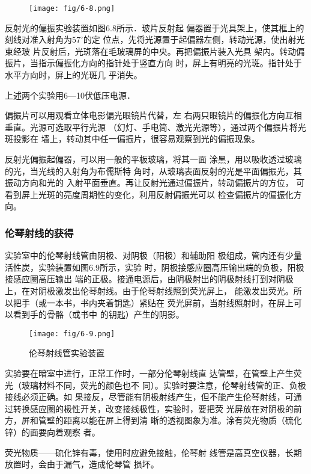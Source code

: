 \begin{figure}[htp]
    \centering
    \texttt{[image: fig/6-8.png]}
    \caption{}
\end{figure}

反射光的偏振实验装置如图6.8所示．玻片反射起
偏器置于光具架上，使其框上的刻线对准入射角为$57^{\circ}$的定
位点，先将光源置于起偏器左侧，转动光源，使出射光束经玻
片反射后，光斑落在毛玻璃屏的中央。再把偏振片装入光具
架内。转动偏振片，当指示偏振化方向的指针处于竖直方向
时，屏上有明亮的光斑。指针处于水平方向时，屏上的光斑几
乎消失。

上述两个实验用6—10伏低压电源．

偏振片可以用观看立体电影偏光眼镜片代替，左
右两只眼镜片的偏振化方向互相垂直。光源可选取平行光源
（幻灯、手电筒、激光光源等），通过两个偏振片将光斑投影在
墙上，转动其中任一偏振片，很容易观察到光的偏振现象。

反射光偏振起偏器，可以用一般的平板玻璃，将其一面
涂黑，用以吸收透过玻璃的光，当光线的入射角为布儒斯特
角时，从玻璃表面反射的光是平面偏振光，其振动方向和光的
入射平面垂直。再让反射光通过偏振片，转动偏振片的方位，
可看到屏上光斑的亮度周期性的变化，利用反射偏振光可以
检查偏振片的偏振化方向。

\subsubsection{伦琴射线的获得}
实验室中的伦琴射线管由阴极、对阴极（阳极）和辅助阳
极组成，管内还有少量活性炭，实验装置如图6.9所示，实验
时，阴极接感应圈高压输出端的负极，阳极接感应圈高压输出
端的正极。接通电源后，由阴极射出的阴极射线打到对阴极
上，在对阴极激发出伦琴射线。由于伦琴射线照到荧光屏上，
能激发出荧光。所以把手（或一本书，书内夹着钥匙）紧贴在
荧光屏前，当射线照射时，在屏上可以看到手的骨骼（或书中
的钥匙）产生的阴影。
\begin{figure}[htp]
    \centering
\texttt{[image: fig/6-9.png]}
    \caption{伦琴射线管实验装置}
\end{figure}

实验要在暗室中进行，正常工作时，一部分伦琴射线直
达管壁，在管壁上产生荧光（玻璃材料不同，荧光的颜色也不
同）。实验时要注意，伦琴射线管的正、负极接线必须正确。如
果接反，尽管能有阴极射线产生，但不能产生伦琴射线，可通
过转换感应圈的极性开关，改变接线极性，实验时，要把荧
光屏放在对阴极的前方，屏和管壁的距离以能在屏上得到清
晰的透视图象为准。涂有荧光物质（硫化锌）的面要向着观察
者。

荧光物质——硫化锌有毒，使用时应避免接触，伦琴射
线管是高真空仪器，长期放置时，会由于漏气，造成伦琴管
损坏。

